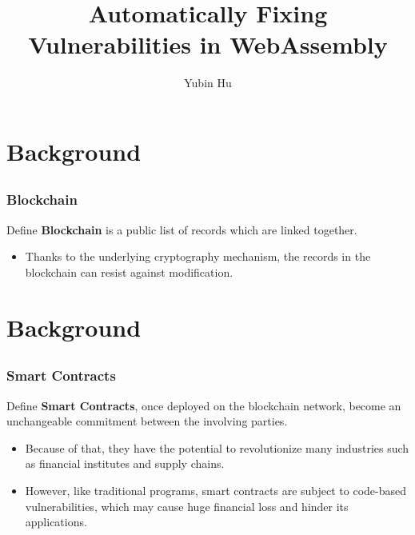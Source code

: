 \documentclass[notheorems, aspectratio=54]{beamer}
\title[Automatically Fixing Vulnerabilities in WebAssembly]{Automatically Fixing Vulnerabilities in WebAssembly}
\author{Yubin Hu}
\institute[BUPT]{yubin.hu@bupt.edu.cn}
\begin{document}
\begin{frame}
    \titlepage
\end{frame}


\section{Background}
\subsection{}
\begin{frame}
    \frametitle{Blockchain}

    \begin{block}{Define}
        \textbf{Blockchain} is a public list of records which are linked together.
    \end{block}

    \begin{itemize}
        \item Thanks to the underlying cryptography mechanism, the records in the blockchain can resist against modification.
    \end{itemize}
    
\end{frame}


\section{Background}
\subsection{}
\begin{frame}
    \frametitle{Smart Contracts}

    \begin{block}{Define}
        \textbf{Smart Contracts}, once deployed on the blockchain network, become an unchangeable commitment between the involving parties. 
    \end{block}

    \begin{itemize}
        \item Because of that, they have the potential to revolutionize many industries such as financial institutes and supply chains.
        \item However, like traditional programs, smart contracts are subject to code-based vulnerabilities, which may cause huge financial loss and hinder its applications.
    \end{itemize}
    
\end{frame}
\end{document}
